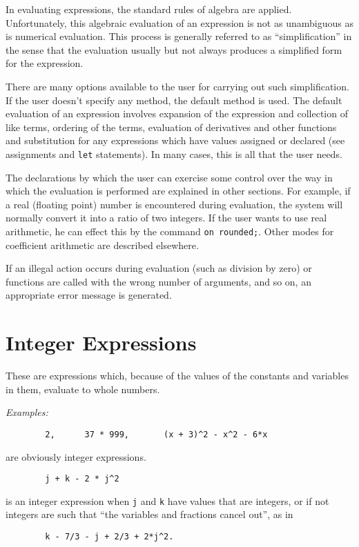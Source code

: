 In evaluating expressions, the standard rules of algebra are applied.
Unfortunately, this algebraic evaluation of an expression is not as
unambiguous as is numerical evaluation. This process is generally referred
to as ``simplification'' in the sense that the
evaluation usually but not always produces a simplified form for the
expression.

There are many options available to the user for carrying out such
simplification.  If the user doesn't specify any
method, the default method is used.  The default evaluation of an
expression involves expansion of the expression and collection of like
terms, ordering of the terms, evaluation of derivatives and other
functions and substitution for any expressions which have values assigned
or declared (see assignments and \texttt{let} statements).  In many cases,
this is all that the user needs.

The declarations by which the user can exercise some control over the way
in which the evaluation is performed are explained in other sections.  For
example, if a real (floating point) number is encountered during
evaluation, the system will normally convert it into a ratio of two
integers.  If the user wants to use real arithmetic, he can effect this by
the command \texttt{on rounded;}. Other modes for
coefficient arithmetic are described elsewhere.

If an illegal action occurs during evaluation (such as division by zero)
or functions are called with the wrong number of arguments, and so on, an
appropriate error message is generated.

\section{Integer Expressions}

These are expressions which, because of the values of the
constants and variables in them, evaluate to whole numbers.

\textit{Examples:}
\begin{verbatim}
        2,      37 * 999,       (x + 3)^2 - x^2 - 6*x
\end{verbatim}
are obviously integer expressions.
\begin{verbatim}
        j + k - 2 * j^2
\end{verbatim}
is an integer expression when \texttt{j} and \texttt{k} have values that are
integers, or if not integers are such that ``the variables and fractions
cancel out'', as in
\begin{verbatim}
        k - 7/3 - j + 2/3 + 2*j^2.
\end{verbatim}

